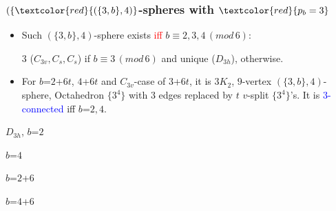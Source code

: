 \documentclass{beamer}
\begin{document}
\begin{frame}\frametitle{$(\{\textcolor{red}{(\{3,b\},4)}$-spheres with
$\textcolor{red}{p_b=3}$}
\vspace{-2mm}
\begin{itemize}
\item 
  Such ${(\{3,b\},4)}$-sphere  exists \textcolor{red}{iff} $b\equiv 
2,3,4\,(mod\,6)$:

$3$ ($C_{3v},C_s,C_s$) if $b\equiv 3\,(mod\,6)$ and unique ($D_{3h}$), otherwise.

\item For $b$=$2$+$6t$, $4$+$6t$ and  $C_{3v}$-case of $3$+$6t$,  
it is $3K_2$, $9$-vertex $(\{3,b\},4)$-sphere,  Octahedron $\{3^4\}$
    with $3$ edges replaced by
$t$ $v$-split
 $\{3^4\}$'s.
It is
\textcolor{blue}{$3$-connected} iff $b$=$2,4$.
\end{itemize}
\vspace{-3mm}   
\begin{center}
\begin{minipage}[b]{19mm}
\centering    
{}\par
$D_{3h}$, $b$=$2$
\end{minipage} 
\begin{minipage}[b]{19mm}
\centering
{}\par
$b$=$4$
\end{minipage}
\begin{minipage}[b]{19mm}
\centering
{}\par
$b$=$2$+$6$
\end{minipage}
\begin{minipage}[b]{19mm}
\centering 
{}\par
$b$=$4$+$6$
\end{minipage}
\end{center} 


\end{frame}
\end{document}
